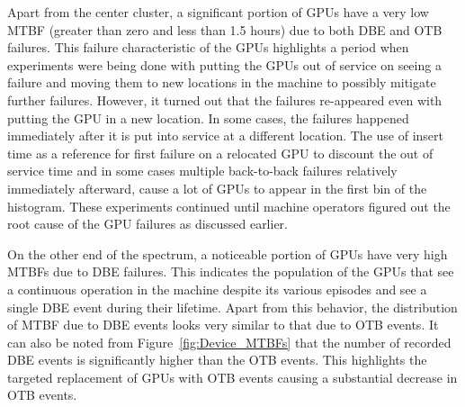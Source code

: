 Apart from the center cluster, a significant portion of GPUs have a very 
low MTBF (greater than zero and less than 1.5 hours) due to both DBE and OTB failures. 
This failure characteristic of the GPUs highlights a period when experiments 
were being done with putting the GPUs out of service on seeing a failure and moving them to new locations 
in the machine to possibly mitigate further failures. However, it turned out that the failures re-appeared 
even with putting the GPU in a new location. In some cases, the failures happened immediately after it is 
put into service at a different location. The use of insert time as a reference for first failure on a relocated
GPU to discount the out of service time and in some cases multiple back-to-back failures relatively immediately afterward,
cause a lot of GPUs to appear in the first bin of the histogram. These experiments continued until machine operators
figured out the root cause of the GPU failures as discussed earlier.  

On the other end of the spectrum, a noticeable portion of GPUs have very high
MTBFs due to DBE failures. This indicates the population of the GPUs that see a continuous operation in the machine 
despite its various episodes and see a single DBE event during their lifetime.
Apart from this behavior, the distribution of MTBF due to DBE events looks very similar to that due 
to OTB events. It can also be noted from Figure~\ref{fig:Device_MTBFs} that the number of recorded 
DBE events is significantly higher than the OTB events. This highlights the targeted replacement of GPUs 
with OTB events causing a substantial decrease in OTB events.  



